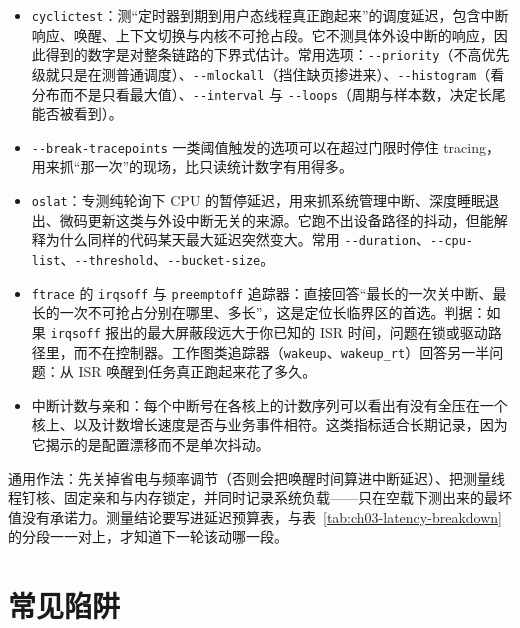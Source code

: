 \documentclass[12pt,a4paper,fontset=fandol]{ctexbook}
\newcommand{\Tp}[1]{\texttt{#1}}
\newcommand{\Opt}[1]{\texttt{-\/-#1}}
\begin{document}
\begin{itemize}
\item \Tp{cyclictest}：测``定时器到期到用户态线程真正跑起来''的调度延迟，包含中断响应、唤醒、上下文切换与内核不可抢占段。它不测具体外设中断的响应，因此得到的数字是对整条链路的下界式估计。常用选项：\Opt{priority}（不高优先级就只是在测普通调度）、\Opt{mlockall}（挡住缺页掺进来）、\Opt{histogram}（看分布而不是只看最大值）、\Opt{interval} 与 \Opt{loops}（周期与样本数，决定长尾能否被看到）。
\item \Opt{break-tracepoints} 一类阈值触发的选项可以在超过门限时停住 tracing，用来抓``那一次''的现场，比只读统计数字有用得多。
\item \Tp{oslat}：专测纯轮询下 CPU 的暂停延迟，用来抓系统管理中断、深度睡眠退出、微码更新这类与外设中断无关的来源。它跑不出设备路径的抖动，但能解释为什么同样的代码某天最大延迟突然变大。常用 \Opt{duration}、\Opt{cpu-list}、\Opt{threshold}、\Opt{bucket-size}。
\item \Tp{ftrace} 的 \Tp{irqsoff} 与 \Tp{preemptoff} 追踪器：直接回答``最长的一次关中断、最长的一次不可抢占分别在哪里、多长''，这是定位长临界区的首选。判据：如果 \Tp{irqsoff} 报出的最大屏蔽段远大于你已知的 ISR 时间，问题在锁或驱动路径里，而不在控制器。工作图类追踪器（\Tp{wakeup}、\Tp{wakeup\_rt}）回答另一半问题：从 ISR 唤醒到任务真正跑起来花了多久。
\item 中断计数与亲和：每个中断号在各核上的计数序列可以看出有没有全压在一个核上、以及计数增长速度是否与业务事件相符。这类指标适合长期记录，因为它揭示的是配置漂移而不是单次抖动。
\end{itemize}

通用作法：先关掉省电与频率调节（否则会把唤醒时间算进中断延迟）、把测量线程钉核、固定亲和与内存锁定，并同时记录系统负载——只在空载下测出来的最坏值没有承诺力。测量结论要写进延迟预算表，与表~\ref{tab:ch03-latency-breakdown}的分段一一对上，才知道下一轮该动哪一段。

\section{常见陷阱}
\end{document}
